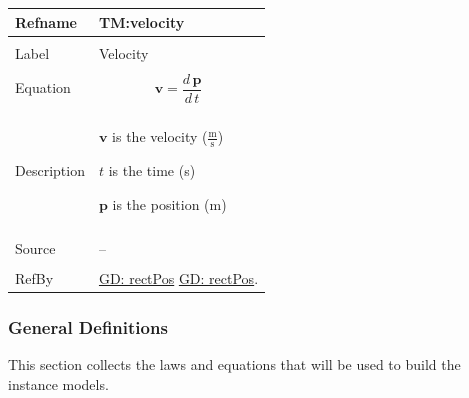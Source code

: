 \documentclass[12pt]{article}
\begin{document}
\noindent \begin{minipage}{\textwidth}
\begin{tabular}{p{} p{}}
\toprule \textbf{Refname} & \textbf{TM:velocity}
\label{TM:velocity}
\\ \midrule \\
Label & Velocity
\\ \midrule \\
Equation & \begin{displaymath}
           \mathbf{v}=\frac{d\,\mathbf{p}}{d\,t}
           \end{displaymath}
\\ \midrule \\
Description & \begin{symbDescription}
              \item{$\mathbf{v}$ is the velocity ($\frac{\text{m}}{\text{s}}$)}
              \item{$t$ is the time (s)}
              \item{$\mathbf{p}$ is the position (m)}
              \end{symbDescription}
\\ \midrule \\
Source & --
\\ \midrule \\
RefBy & \hyperref[GD:rectPos]{GD: rectPos} \hyperref[GD:rectPos]{GD: rectPos}.
\\ \bottomrule \end{tabular}
\end{minipage}
\subsubsection{General Definitions}
\label{Sec:GDs}
This section collects the laws and equations that will be used to build the instance models.
\par~
\end{document}

